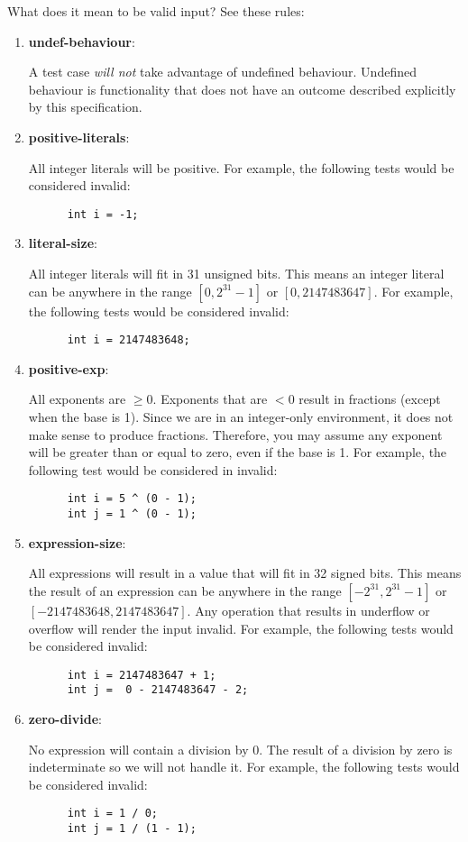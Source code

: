 \documentclass{article}
\newcommand{\assertiondest}[1]{\hypertarget{#1}{\textbf{#1}:}}
\begin{document}
What does it mean to be valid input? See these rules:
\begin{enumerate}
  \item
    \assertiondest{undef-behaviour}
    A test case \textit{will not} take advantage of undefined behaviour. Undefined behaviour is
    functionality that does not have an outcome described explicitly by this specification.
  \item
    \assertiondest{positive-literals}
    All integer literals will be positive. For example, the following tests would be considered
    invalid:
    \begin{lstlisting}
      int i = -1;
    \end{lstlisting}
  \item
    \assertiondest{literal-size}
    All integer literals will fit in 31 unsigned bits. This means an integer literal can be
    anywhere in the range $[0, 2^{31} - 1]$ or $[0, 2147483647]$. For example, the following tests
    would be considered invalid:
    \begin{lstlisting}
      int i = 2147483648;
    \end{lstlisting}
  \item
    \assertiondest{positive-exp}
    All exponents are $\geq 0$. Exponents that are $< 0$ result in fractions (except when the
    base is 1). Since we are in an integer-only environment, it does not make sense to produce
    fractions. Therefore, you may assume any exponent will be greater than or equal to zero, even
    if the base is 1. For example, the following test would be considered in invalid:
    \begin{lstlisting}
      int i = 5 ^ (0 - 1);
      int j = 1 ^ (0 - 1);
    \end{lstlisting}
  \item
    \assertiondest{expression-size}
    All expressions will result in a value that will fit in 32 signed bits. This means the result
    of an expression can be anywhere in the range $[-2^{31}, 2^{31} - 1]$ or $[-2147483648,
    2147483647]$. Any operation that results in underflow or overflow will render the input
    invalid. For example, the following tests would be considered invalid:
    \begin{lstlisting}
      int i = 2147483647 + 1;
      int j =  0 - 2147483647 - 2;
    \end{lstlisting}
  \item
    \assertiondest{zero-divide}
    No expression will contain a division by 0. The result of a division by zero is indeterminate
    so we will not handle it. For example, the following tests would be considered invalid:
    \begin{lstlisting}
      int i = 1 / 0;
      int j = 1 / (1 - 1);
    \end{lstlisting}
\end{enumerate}
\end{document}
